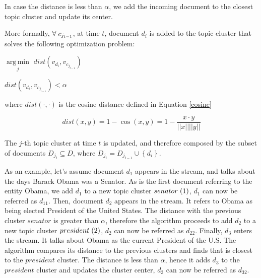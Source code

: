 \documentclass{article}
\DeclareMathOperator*{\argmin}{arg\,min}
\begin{document}
In case the distance is less than $\alpha$, we add the incoming document to the closest topic cluster and update its center. 

More formally, $\forall\hspace{1mm}c_{j_{t-1}}$, at time $t$, document $d_i$ is added to the topic cluster that solves the following optimization problem:\\

\centerline{$\underset{j}{\argmin}$\;\; $dist(v_{d_i}, v_{c_{j_{t-1}}})$} 
\medskip
\centerline{ $dist(v_{d_i}, v_{c_{j_{t-1}}}) < \alpha$}

where $dist(\cdot,\cdot)$ is the cosine distance defined in Equation \ref{cosine}

\begin{equation}
\label{cosine}
dist(x,y) = 1 - \cos(x,y) = 1 - \frac{x \cdot y}{||x||||y||}
\end{equation}

The $j$-th topic cluster at time $t$ is updated, and therefore composed by the subset of documents $D_{j_t} \subseteq D$, where $D_{j_t} = D_{j_{t-1}} \cup \left\{ {d_i}\right\}$.


As an example, let's assume document $d_1$ appears in the stream, and talks about the days Barack Obama was a Senator. As is the first document referring to the entity Obama, we add $d_1$ to a new topic cluster $senator\hspace{1mm}(1)$, $d_1$ can now be referred as $d_{11}$. Then, document $d_2$ appears in the stream. It refers to Obama as being elected President of the United States. The distance with the previous cluster $senator$ is greater than $\alpha$, therefore the algorithm proceeds to add $d_2$ to a new topic cluster $president\hspace{1mm}(2)$, $d_2$ can now be referred as $d_{22}$. Finally, $d_3$ enters the stream. It talks about Obama as the current President of the U.S. The algorithm compares its distance to the previous clusters and finds that is closest to the $president$ cluster. The distance is less than $\alpha$, hence it adds $d_3$ to the $president$ cluster and updates the cluster center, $d_3$ can now be referred as $d_{32}$.
\end{document}
